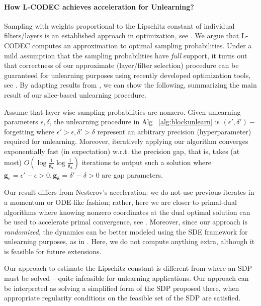 \paragraph{How L-CODEC achieves acceleration for Unlearning?}
Sampling with weights proportional to the Lipschitz constant of individual filters/layers is an established approach in optimization, see \cite{gorbunov2020unified}. We argue that L-CODEC computes an approximation to optimal sampling probabilities.
Under a mild assumption that the sampling probabilities have \emph{full} support, it turns out that correctness of our approximate (layer/filter selection) procedure can be guaranteed for unlearning purposes using recently developed optimization tools, see \cite{gower2019sgd}. By adapting results from \cite{gorbunov2020unified}, we can show the following, summarizing the main result of our slice-based unlearning procedure.
\begin{theorem}
Assume that layer-wise sampling probabilities are nonzero. Given unlearning parameters $\epsilon,\delta$, the unlearning procedure in Alg~ \ref{alg:blockunlearn} is $(\epsilon',\delta')-$forgetting where $\epsilon'>\epsilon,\delta'>\delta$ represent an arbitrary  precision (hyperparameter) required for unlearning. Moreover, iteratively applying our algorithm converges exponentially fast (in expectation) w.r.t. the precision gap, that is, takes (at most) $O(\log\frac{1}{\mathbf{g_{\epsilon}}}\log\frac{1}{\mathbf{g_{\delta}}})$ iterations to output such a solution where  $\mathbf{g_{\epsilon}} = \epsilon'-\epsilon>0,\mathbf{g_{\delta}}=\delta'-\delta>0$ are gap parameters.
\end{theorem}
Our result differs from Nesterov's acceleration: we do not use previous iterates in a momentum or ODE-like fashion; rather, here we are closer to primal-dual algorithms where knowing nonzero coordinates at the dual optimal solution  
can be used to accelerate primal convergence, see \cite{diakonikolas2019approximate}. Moreover, since our approach is \textit{randomized}, the dynamics can be better modeled using the SDE framework for unlearning purposes, as in \cite{simsekli2020fractional}. 
Here, we do not  compute anything extra, although it is feasible for future extensions.
\begin{remark}
Our approach to estimate the Lipschitz constant is different from \cite{fazlyab2019efficient} where an SDP must be solved -- quite infeasible for unlearning applications. Our approach can be interpreted as solving a simplified form of the SDP proposed there, when appropriate regularity conditions on the feasible set of the SDP are satisfied. %
\end{remark}

